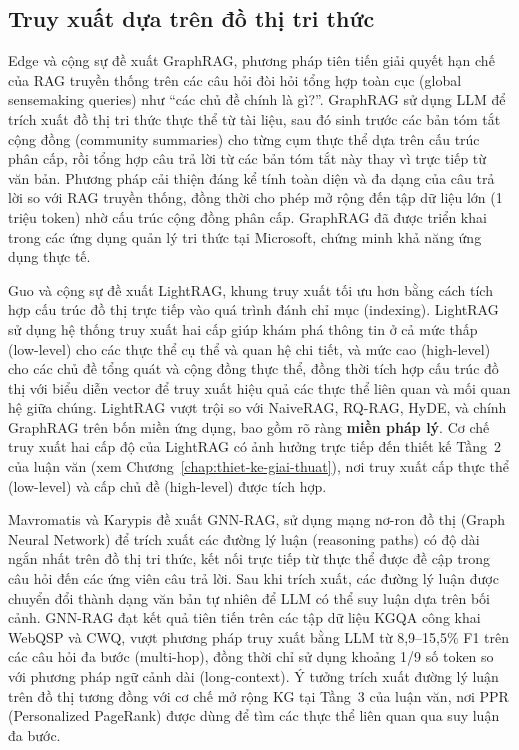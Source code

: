 \subsection{Truy xuất dựa trên đồ thị tri thức}
\label{subsec:graph-rag}

Edge và cộng sự \cite{edge2024graphrag} đề xuất GraphRAG, phương pháp tiên tiến
giải quyết hạn chế của RAG truyền thống trên các câu hỏi đòi hỏi tổng hợp toàn
cục (global sensemaking queries) như ``các chủ đề chính là gì?''. GraphRAG sử dụng
LLM để trích xuất đồ thị tri thức thực thể từ tài liệu, sau đó sinh trước các bản
tóm tắt cộng đồng (community summaries) cho từng cụm thực thể dựa trên cấu trúc
phân cấp, rồi tổng hợp câu trả lời từ các bản tóm tắt này thay vì trực tiếp từ
văn bản. Phương pháp cải thiện đáng kể tính toàn diện và đa dạng của câu trả lời
so với RAG truyền thống, đồng thời cho phép mở rộng đến tập dữ liệu lớn (1 triệu
token) nhờ cấu trúc cộng đồng phân cấp. GraphRAG đã được triển khai trong các ứng
dụng quản lý tri thức tại Microsoft, chứng minh khả năng ứng dụng thực tế.

Guo và cộng sự \cite{guo2025lightrag} đề xuất LightRAG, khung truy xuất tối ưu hơn
bằng cách tích hợp cấu trúc đồ thị trực tiếp vào quá trình đánh chỉ mục (indexing).
LightRAG sử dụng hệ thống truy xuất hai cấp giúp khám phá thông tin ở cả mức thấp
(low-level) cho các thực thể cụ thể và quan hệ chi tiết, và mức cao (high-level)
cho các chủ đề tổng quát và cộng đồng thực thể, đồng thời tích hợp cấu trúc đồ thị
với biểu diễn vector để truy xuất hiệu quả các thực thể liên quan và mối quan hệ
giữa chúng. LightRAG vượt trội so với NaiveRAG, RQ-RAG, HyDE, và chính GraphRAG
trên bốn miền ứng dụng, bao gồm rõ ràng \textbf{miền pháp lý}. Cơ chế truy xuất
hai cấp độ của LightRAG có ảnh hưởng trực tiếp đến thiết kế Tầng~2 của luận văn
(xem Chương~\ref{chap:thiet-ke-giai-thuat}), nơi truy xuất cấp thực thể
(low-level) và cấp chủ đề (high-level) được tích hợp.

\begin{sloppypar}
Mavromatis và Karypis \cite{mavromatis2024gnnrag} đề xuất GNN-RAG, sử dụng mạng
nơ-ron đồ thị (Graph Neural Network) để trích xuất các đường lý luận
(reasoning paths) có độ dài ngắn nhất trên đồ thị tri thức, kết nối trực tiếp từ
thực thể được đề cập trong câu hỏi đến các ứng viên câu trả lời. Sau khi trích
xuất, các đường lý luận được chuyển đổi thành dạng văn bản tự nhiên để LLM có thể
suy luận dựa trên bối cảnh. GNN-RAG đạt kết quả tiên tiến trên các tập dữ liệu
KGQA công khai WebQSP và CWQ, vượt phương pháp truy xuất bằng LLM từ
8,9--15,5\% F1 trên các câu hỏi đa bước (multi-hop), đồng thời chỉ sử dụng khoảng
1/9 số token so với phương pháp ngữ cảnh dài (long-context). Ý tưởng trích xuất
đường lý luận trên đồ thị tương đồng với cơ chế mở rộng KG tại Tầng~3 của luận
văn, nơi PPR (Personalized PageRank) được dùng để tìm các thực thể liên quan qua
suy luận đa bước.
\end{sloppypar}

